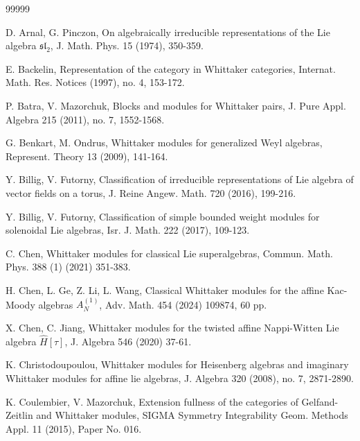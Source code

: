 \documentclass[12pt,a4paper]{amsart}
\def\sl{\mathfrak{sl}}
\begin{document}
\begin{thebibliography}{99999}

D. Arnal, G. Pinczon, On algebraically irreducible representations of the Lie algebra $\sl_2$, J. Math. Phys. 15 (1974), 350-359.

E. Backelin, Representation of the category in Whittaker categories, Internat. Math. Res. Notices (1997), no. 4, 153-172.

P. Batra, V. Mazorchuk, Blocks and modules for Whittaker pairs, J. Pure Appl. Algebra 215 (2011), no. 7, 1552-1568.

G. Benkart, M. Ondrus, Whittaker modules for generalized Weyl algebras, Represent. Theory 13 (2009), 141-164.


Y. Billig, V. Futorny, Classification of irreducible representations of Lie algebra of vector fields on a torus, J. Reine Angew. Math. 720 (2016), 199-216.

Y. Billig, V. Futorny, Classification of simple bounded weight modules for solenoidal Lie algebras, Isr. J. Math. 222 (2017), 109-123.







 C. Chen, Whittaker modules for classical Lie superalgebras, Commun. Math. Phys. 388 (1) (2021) 351-383.


H.  Chen, L. Ge, Z. Li, L. Wang, Classical Whittaker modules for the affine Kac-Moody algebras  $A^{(1)}_N$, Adv. Math. 454 (2024) 109874, 60 pp.

   X. Chen, C. Jiang, Whittaker modules for the twisted affine Nappi-Witten Lie algebra  $\widehat{H}[\tau]$, J. Algebra 546 (2020) 37-61.

K. Christodoupoulou, Whittaker modules for Heisenberg algebras and imaginary Whittaker modules for affine lie algebras, J. Algebra 320 (2008), no. 7, 2871-2890.

    K. Coulembier, V. Mazorchuk, Extension fullness of the categories of Gelfand-Zeitlin and Whittaker modules, SIGMA Symmetry Integrability Geom. Methods Appl. 11 (2015), Paper No. 016.




\end{thebibliography}
\end{document}
